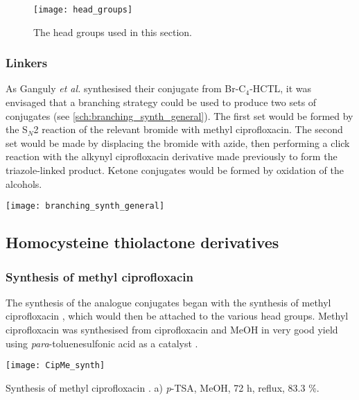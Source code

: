 \begin{figure}[H]
	\begin{center}
		\texttt{[image: head\_groups]}
		\caption{The head groups used in this section.\label{fig:head_groups}}
	\end{center}
\end{figure}

\subsubsection{Linkers}

As Ganguly \textit{et al.}\cite{Ganguly2001} synthesised their conjugate from Br-C$_4$-HCTL, it was envisaged that a branching strategy could be used to produce two sets of conjugates (see \ref{sch:branching_synth_general}). The first set would be formed by the S$_N$2 reaction of the relevant bromide with methyl ciprofloxacin. The second set would be made by displacing the bromide with azide, then performing a click reaction with the alkynyl ciprofloxacin derivative  made previously to form the triazole-linked product. Ketone conjugates would be formed by oxidation of the alcohols.

\begin{scheme}[H]
	\begin{center}
		\texttt{[image: branching\_synth\_general]}
		\caption{\label{sch:branching_synth_general}}
	\end{center}
\end{scheme}

\subsection{Homocysteine thiolactone derivatives\label{sec:HCTL}}

\subsubsection{Synthesis of methyl ciprofloxacin }

The synthesis of the analogue conjugates began with the synthesis of methyl ciprofloxacin , which would then be attached to the various head groups.
Methyl ciprofloxacin  was synthesised from ciprofloxacin  and MeOH in very good yield using \textit{para}-toluenesulfonic acid as a catalyst \cite{Sachin2010}.

\begin{scheme}[H]
	\begin{center}
		\texttt{[image: CipMe\_synth]}
		\caption{Synthesis of methyl ciprofloxacin . a) \textit{p}-TSA, MeOH, 72 h, reflux, 83.3 \%. \label{sch:CipMe_synth}}
	\end{center}
\end{scheme}

